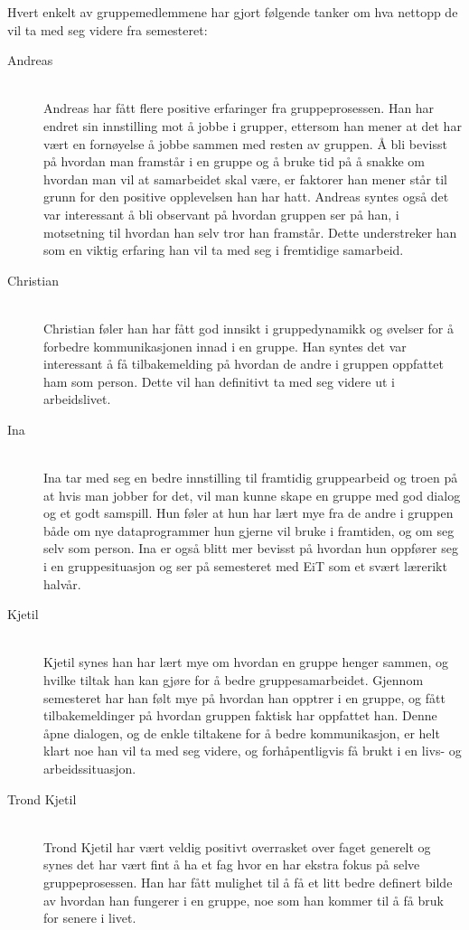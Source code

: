 Hvert enkelt av gruppemedlemmene har gjort følgende tanker om hva nettopp de vil ta med seg videre fra semesteret:
\begin{description}
\item[Andreas] \hfill \\
Andreas har fått flere positive erfaringer fra gruppeprosessen. Han har endret sin innstilling mot å jobbe i grupper, ettersom han mener at det har vært en fornøyelse å jobbe sammen med resten av gruppen. Å bli bevisst på hvordan man framstår i en gruppe og å bruke tid på å snakke om hvordan man vil at samarbeidet skal være, er faktorer han mener står til grunn for den positive opplevelsen han har hatt. Andreas syntes også det var interessant å bli observant på hvordan gruppen ser på han, i motsetning til hvordan han selv tror han framstår. Dette understreker han som en viktig erfaring han vil ta med seg i fremtidige samarbeid.

\item[Christian] \hfill \\
Christian føler han har fått god innsikt i gruppedynamikk og øvelser for å forbedre kommunikasjonen innad i en gruppe. Han syntes det var interessant å få tilbakemelding på hvordan de andre i gruppen oppfattet ham som person. Dette vil han definitivt ta med seg videre ut i arbeidslivet.  

\item[Ina] \hfill \\
Ina tar med seg en bedre innstilling til framtidig gruppearbeid og troen på at hvis man jobber for 
det, vil man kunne skape en gruppe med god dialog og et godt samspill. Hun føler at hun har lært mye fra de andre
i gruppen både om nye dataprogrammer hun gjerne vil bruke i framtiden, og om seg selv som person.
Ina er også blitt mer bevisst på hvordan hun oppfører seg i en gruppesituasjon og ser på semesteret med
EiT som et svært lærerikt halvår.

\item[Kjetil] \hfill \\
Kjetil synes han har lært mye om hvordan en gruppe henger sammen, og
hvilke tiltak han kan gjøre for å bedre gruppesamarbeidet. Gjennom
semesteret har han følt mye på hvordan han opptrer i en gruppe, og fått
tilbakemeldinger på hvordan gruppen faktisk har oppfattet han. Denne
åpne dialogen, og de enkle tiltakene for å bedre kommunikasjon, er helt
klart noe han vil ta med seg videre, og forhåpentligvis få brukt i en
livs- og arbeidssituasjon.

\item[Trond Kjetil] \hfill \\
Trond Kjetil har vært veldig positivt overrasket over faget generelt og synes det har vært fint å ha et fag hvor en har ekstra fokus på selve gruppeprosessen. Han har fått mulighet til å få et litt bedre definert bilde av hvordan han fungerer i en gruppe, noe som han kommer til å få bruk for senere i livet.

\end{description}
